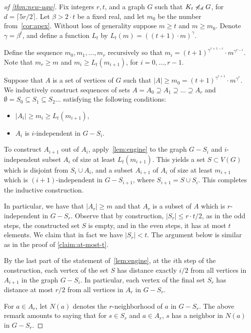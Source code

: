 \begin{proof}[of \cref{thm:new-uqw}]
Fix integers $r,t$,  and a graph $G$ such that $K_t\not\preccurlyeq_{d} G$,
for $d=\lceil 5r/2 \rceil$. Let $\beta>2\cdot t$ be a fixed real, and let $m_0$ be the number from~\cref{cor:apex}. Without loss of generality suppose $m\geq t$ and $m\ge m_0$.
 Denote $\gamma=\beta^t$, and
define a function $L_t$ by $L_t(m)=((t+1)\cdot m)^\gamma$.

Define the sequence $m_0,m_1,\ldots,m_r$ recursively so that $m_i=
(t+1)^{\gamma^{r+1-i}}\cdot m^{\gamma^{r-i}}$. Note that $m_r\ge m$
and $m_i\ge L_t(m_{i+1})$, for $i=0,\ldots,r-1$.

Suppose that $A$ is a set of vertices of $G$ such that $|A|\ge m_0=(t+1)^{\gamma^{r+1}}\cdot m^{\gamma^{r}}$. We inductively construct sequences of sets $A= A_0\supseteq A_1\supseteq \ldots \supseteq A_r$ and $\emptyset=S_0\subseteq S_1\subseteq S_2\ldots$
satisfying the following conditions:
\begin{itemize}
	\item $|A_i|\ge m_i \ge L_t(m_{i+1})$,
	\item $A_i$ is $i$-independent in $G-S_i$.
\end{itemize}
To construct $A_{i+1}$ out of $A_i$, apply~\cref{lem:engine} to the graph $G-S_i$ and 
$i$-independent subset $A_i$ of size at least $L_t(m_{i+1})$. This yields a set $S\subset V(G)$ which is disjoint from $S_i\cup A_i$, and a subset $A_{i+1}$ of $A_i$ of size 
at least $m_{i+1}$
which is $(i+1)$-independent in $G-S_{i+1}$, where $S_{i+1}=S\cup S_i$. This completes the inductive construction.

In particular, we have that $|A_r|\ge m$ and that $A_r$ is a subset of $A$ which is $r$-independent in $G-S_r$.
Observe that by construction, $|S_r|\le r\cdot t/2$, as in the odd steps, the constructed set $S$ is empty, and in the even steps, it has at most $t$ elements.  We claim that in fact we have $|S_r|<t$. The argument below is similar as in the proof of \cref{claim:at-most-t}.


By the last part of the statement of~\cref{lem:engine},  at the $i$th step of the construction, each vertex of the set $S$
has distance exactly $i/2$ from all vertices in $A_{i+1}$ in the graph 
$G-S_i$. In particular, 
each vertex of the final set $S_r$ has distance at most $r/2$ from all vertices in $A_r$
in $G-S_r$. 

For $a\in A_r$, let $N(a)$ denotes the $r$-neighborhood of $a$ in $G-S_r$.
The above remark amounts to saying that for $s\in S_r$ and $a\in A_r$, $s$ has a neighbor in $N(a)$ in $G-S_r$.


\end{proof}
